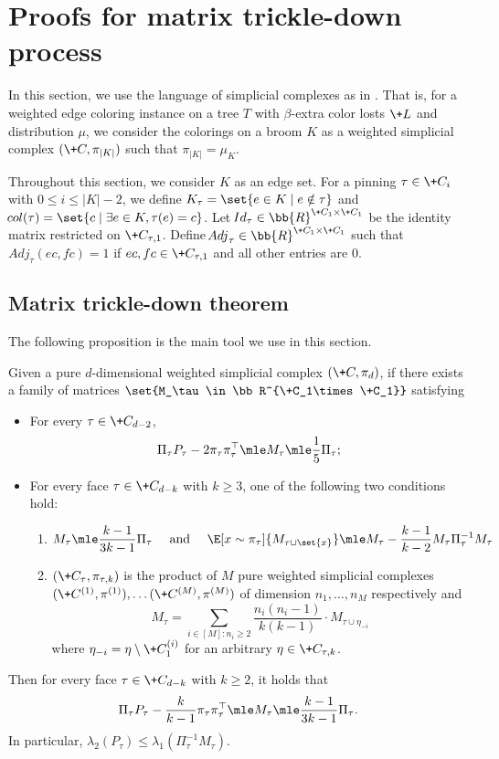 \section{Proofs for matrix trickle-down process}
\label{appendix-mtd}
In this section, we use the language of simplicial complexes as in .
That is, for a weighted edge coloring instance on a tree $T$ with $\beta$-extra
color losts $\+L$ and distribution $\mu$, we consider the colorings on a broom $K$ 
as a weighted simplicial complex $(\+C, \pi_{|K|})$ such that $\pi_{|K|} = \mu_K$.

Throughout this section, we consider $K$ as an edge set.
For a pinning $\tau\in \+C_{i}$ with $0\le i\le|K|-2$, we define
$K_\tau = \set{e\in K\mid e\notin \tau}$ and $\!{col}(\tau)=\set{c \mid \exists e\in K, \tau(e)=c}$. Let $\!{Id}_\tau \in \bb{R}^{\+C_1\times \+C_1}$ be the identity matrix restricted on $\+C_{\tau,1}$. Define 
$\!{Adj}_\tau \in \bb{R}^{\+C_1\times \+C_1}$ such that $\!{Adj}_\tau(ec,fc)=1$ if $ec,fc\in \+C_{\tau,1}$ and all other entries are $0$.
\subsection{Matrix trickle-down theorem}
The following proposition is the main tool we use in this section.
\begin{proposition}
	\label{thm:mtd-inductive}
	Given a pure $d$-dimensional weighted simplicial complex $(\+C,\pi_d)$, if there exists a family of matrices $\set{M_\tau\in\bb R^{\+C_1\times \+C_1}}$ satisfying
	\begin{itemize}
		\item For every $\tau\in\+C_{d-2}$, 
		\[
			\Pi_\tau P_\tau -2 \pi_\tau \pi_\tau^\top \mle M_\tau \mle \frac{1}{5}\Pi_\tau;
		\]
		\item For every face $\tau\in \+C_{d-k}$ with $k\geq 3$, one of the following two conditions hold:
		\begin{enumerate}
			\item 
			\[
				M_\tau \mle \frac{k-1}{3k-1}\Pi_\tau\quad\mbox{ and }\quad\E[x\sim\pi_\tau]{M_{\tau\cup\set{x}}}\mle M_\tau -\frac{k-1}{k-2}M_\tau\Pi^{-1}_\tau M_\tau
			\]
			\item $(\+C_\tau,\pi_{\tau,k})$ is the product of $M$ pure weighted simplicial complexes $(\+C^{(1)},\pi^{(1)}), \dots (\+C^{(M)},\pi^{(M)})$ of dimension $n_1,\dots,n_M$ respectively and
			\[
				M_\tau = \sum_{i\in [M]\colon n_i\ge 2} \frac{n_i(n_i-1)}{k(k-1)}\cdot M_{\tau\cup \eta_{-i}}
			\]
			where $\eta_{-i} = \eta\setminus \+C^{(i)}_1$ for an arbitrary $\eta\in \+C_{\tau,k}$.
			\end{enumerate}
	\end{itemize}
	Then for every face $\tau\in\+C_{d-k}$ with $k\geq 2$, it holds that
	\[
		\Pi_\tau P_\tau -\frac{k}{k-1}\pi_\tau \pi_\tau^\top \mle M_\tau \mle \frac{k-1}{3k-1}\Pi_\tau.
	\]
	In particular, $\lambda_2(P_\tau)\le \lambda_1(\Pi_\tau^{-1}M_\tau)$.
\end{proposition}

